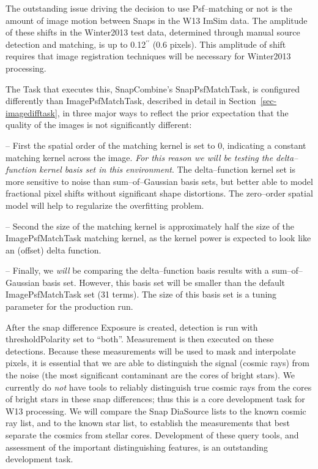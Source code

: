 \documentclass[12pt]{article}
\def\arcsec{^{\prime\prime}}
\begin{document}
The outstanding issue driving the decision to use Psf--matching or not
is the amount of image motion between Snaps in the W13 ImSim data.
The amplitude of these shifts in the Winter2013 test data, determined
through manual source detection and matching, is up to 0.12$\arcsec$
(0.6 pixels).  This amplitude of shift requires that image
registration techniques will be necessary for Winter2013 processing.

The Task that executes this, SnapCombine's SnapPsfMatchTask, is
configured differently than ImagePsfMatchTask, described in detail in
Section~\ref{sec-imagedifftask}, in three major ways to reflect the
prior expectation that the quality of the images is not significantly
different:

-- First the spatial order of the matching kernel is set to 0,
indicating a constant matching kernel across the image.  {\it For this
  reason we will be testing the delta--function kernel basis set in
  this environment}.  The delta--function kernel set is more sensitive
to noise than sum--of--Gaussian basis sets, but better able to model
fractional pixel shifts without significant shape distortions.  The
zero--order spatial model will help to regularize the overfitting
problem.

-- Second the size of the matching kernel is approximately half the
size of the ImagePsfMatchTask matching kernel, as the kernel power is
expected to look like an (offset) delta function.

-- Finally, we {\it will} be comparing the delta--function basis
results with a sum--of--Gaussian basis set.  However, this basis set
will be smaller than the default ImagePsfMatchTask set (31 terms).
The size of this basis set is a tuning parameter for the production
run.

After the snap difference Exposure is created, detection is run with
thresholdPolarity set to ``both''.  Measurement is then executed on
these detections.  Because these measurements will be used to mask and
interpolate pixels, it is essential that we are able to distinguish
the signal (cosmic rays) from the noise (the most significant
contaminant are the cores of bright stars).  We currently do {\it not}
have tools to reliably distinguish true cosmic rays from the cores of
bright stars in these snap differences; thus this is a core
development task for W13 processing.  We will compare the Snap
DiaSource lists to the known cosmic ray list, and to the known star
list, to establish the measurements that best separate the cosmics
from stellar cores.  Development of these query tools, and assessment
of the important distinguishing features, is an outstanding
development task.
\end{document}
